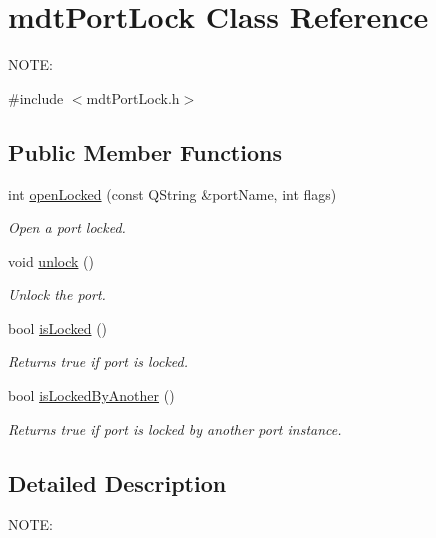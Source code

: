 \hypertarget{classmdt_port_lock}{
\section{mdtPortLock Class Reference}
\label{classmdt_port_lock}
}


NOTE:  




{\ttfamily \#include $<$mdtPortLock.h$>$}

\subsection*{Public Member Functions}
\begin{DoxyCompactItemize}
\item 
int \hyperlink{classmdt_port_lock_a25e9a2cb8a10069fae75c76b6809c27f}{openLocked} (const QString \&portName, int flags)
\begin{DoxyCompactList}\small\item\em Open a port locked. \end{DoxyCompactList}\item 
void \hyperlink{classmdt_port_lock_a60b65f02d57568dc36c5e918aa5357a6}{unlock} ()
\begin{DoxyCompactList}\small\item\em Unlock the port. \end{DoxyCompactList}\item 
\hypertarget{classmdt_port_lock_a07a7d13509147d65dde89e95ac343eb2}{
bool \hyperlink{classmdt_port_lock_a07a7d13509147d65dde89e95ac343eb2}{isLocked} ()}
\label{classmdt_port_lock_a07a7d13509147d65dde89e95ac343eb2}

\begin{DoxyCompactList}\small\item\em Returns true if port is locked. \end{DoxyCompactList}\item 
bool \hyperlink{classmdt_port_lock_a739a8cedebb1a32e122c7e451f0cfe98}{isLockedByAnother} ()
\begin{DoxyCompactList}\small\item\em Returns true if port is locked by another port instance. \end{DoxyCompactList}\end{DoxyCompactItemize}


\subsection{Detailed Description}
NOTE: 

